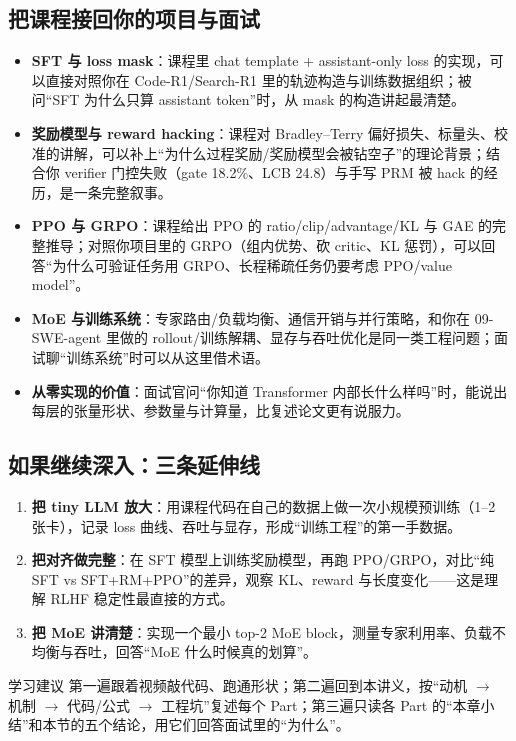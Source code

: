 \subsection{把课程接回你的项目与面试}

\begin{itemize}
  \item \textbf{SFT 与 loss mask}：课程里 chat template + assistant-only loss 的实现，可以直接对照你在 Code-R1/Search-R1 里的轨迹构造与训练数据组织；被问“SFT 为什么只算 assistant token”时，从 mask 的构造讲起最清楚。
  \item \textbf{奖励模型与 reward hacking}：课程对 Bradley--Terry 偏好损失、标量头、校准的讲解，可以补上“为什么过程奖励/奖励模型会被钻空子”的理论背景；结合你 verifier 门控失败（gate 18.2\%、LCB 24.8）与手写 PRM 被 hack 的经历，是一条完整叙事。
  \item \textbf{PPO 与 GRPO}：课程给出 PPO 的 ratio/clip/advantage/KL 与 GAE 的完整推导；对照你项目里的 GRPO（组内优势、砍 critic、KL 惩罚），可以回答“为什么可验证任务用 GRPO、长程稀疏任务仍要考虑 PPO/value model”。
  \item \textbf{MoE 与训练系统}：专家路由/负载均衡、通信开销与并行策略，和你在 09-SWE-agent 里做的 rollout/训练解耦、显存与吞吐优化是同一类工程问题；面试聊“训练系统”时可以从这里借术语。
  \item \textbf{从零实现的价值}：面试官问“你知道 Transformer 内部长什么样吗”时，能说出每层的张量形状、参数量与计算量，比复述论文更有说服力。
\end{itemize}

\subsection{如果继续深入：三条延伸线}

\begin{enumerate}
  \item \textbf{把 tiny LLM 放大}：用课程代码在自己的数据上做一次小规模预训练（1--2 张卡），记录 loss 曲线、吞吐与显存，形成“训练工程”的第一手数据。
  \item \textbf{把对齐做完整}：在 SFT 模型上训练奖励模型，再跑 PPO/GRPO，对比“纯 SFT vs SFT+RM+PPO”的差异，观察 KL、reward 与长度变化——这是理解 RLHF 稳定性最直接的方式。
  \item \textbf{把 MoE 讲清楚}：实现一个最小 top-2 MoE block，测量专家利用率、负载不均衡与吞吐，回答“MoE 什么时候真的划算”。
\end{enumerate}

\begin{knowledgebox}{学习建议}
第一遍跟着视频敲代码、跑通形状；第二遍回到本讲义，按“动机 $\rightarrow$ 机制 $\rightarrow$ 代码/公式 $\rightarrow$ 工程坑”复述每个 Part；第三遍只读各 Part 的“本章小结”和本节的五个结论，用它们回答面试里的“为什么”。
\end{knowledgebox}

